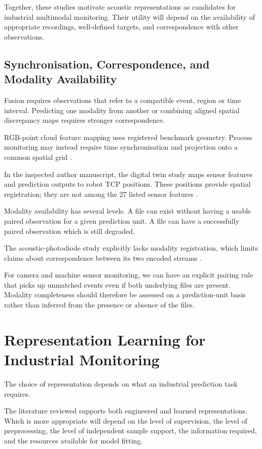 Together, these studies motivate acoustic representations as candidates for industrial multimodal
monitoring. Their utility will depend on the availability of appropriate recordings, well-defined
targets, and correspondence with other observations.

\subsection{Synchronisation, Correspondence, and Modality Availability}

Fusion requires observations that refer to a compatible event, region or time interval. Predicting
one modality from another or combining aligned spatial discrepancy maps requires stronger
correspondence.

RGB-point cloud feature mapping uses registered benchmark geometry. Process monitoring may instead
require time synchronisation and projection onto a common spatial grid
\parencite{Costanzino2024Multimodal,Petrich2021Multimodal}.

In the inspected author manuscript, the digital twin study maps sensor features and prediction
outputs to robot TCP positions. These positions provide spatial registration; they are not among
the 27 listed sensor features \parencite{Chen2023Multisensor}.

Modality availability has several levels. A file can exist without having a usable paired
observation for a given prediction unit. A file can have a successfully paired observation which is
still degraded.

The acoustic-photodiode study explicitly lacks modality registration, which limits claims about
correspondence between its two encoded streams \parencite{Li2022A}.

For camera and machine sensor monitoring, we can have an explicit pairing rule that picks up
unmatched events even if both underlying files are present. Modality completeness should therefore
be assessed on a prediction-unit basis rather than inferred from the presence or absence of the
files.

\section{Representation Learning for Industrial Monitoring}

The choice of representation depends on what an industrial prediction task requires.

The literature reviewed supports both engineered and learned representations. Which is more
appropriate will depend on the level of supervision, the level of preprocessing, the level of
independent sample support, the information required, and the resources available for model fitting.

